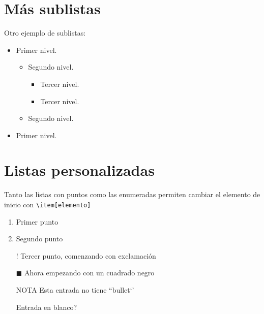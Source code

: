 
\section{Más sublistas}

Otro ejemplo de sublistas:
\begin{itemize}
  \item Primer nivel.
  \begin{itemize}
    \item Segundo nivel.
    \begin{itemize}
      \item Tercer nivel.
      \item Tercer nivel.
    \end{itemize}
    \item Segundo nivel.
  \end{itemize}
  \item Primer nivel.
\end{itemize}


\section{Listas personalizadas}

Tanto las listas con puntos como las enumeradas permiten cambiar el elemento de inicio con \verb|\item[elemento]|
\begin{enumerate}
  \item Primer punto
  \item Segundo punto
  \item[!] Tercer punto, comenzando con exclamación
  \item[$\blacksquare$] Ahora empezando con un cuadrado negro
  \item[NOTA] Esta entrada no tiene ``bullet‘’
  \item[] Entrada en blanco?
\end{enumerate}
